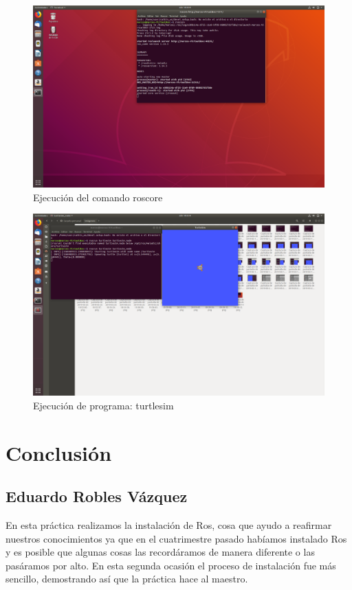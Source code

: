 \documentclass[11pt,a4paper,oldfontcommands,oneside]{memoir}
\begin{document}
\begin{figure}[h]
	\includegraphics[scale=.25]{link21.png}
	\caption{Ejecución del comando roscore}
	\label{roscore1}
\end{figure}

\begin{figure}[h]
\includegraphics[scale=.25]{link23.png}
\caption{Ejecución de programa: turtlesim}
	\label{roscore2}
\end{figure}
\vspace{2cm}
\hfill

\chapter{Conclusión }
\section{Eduardo Robles Vázquez }
En esta práctica realizamos la instalación de Ros, cosa que ayudo a reafirmar nuestros conocimientos ya que en el cuatrimestre pasado habíamos instalado Ros y es posible que algunas cosas las recordáramos de manera diferente o las pasáramos por alto. En esta segunda ocasión el proceso de instalación fue más sencillo, demostrando así que la práctica hace al maestro. 

\vspace{2cm}
\hfill


\end{document}
